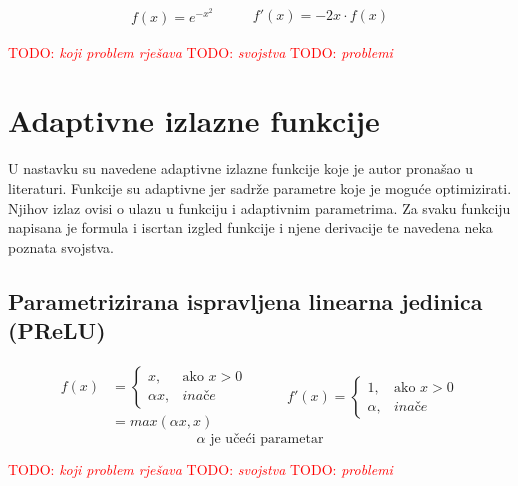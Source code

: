 \documentclass[times, utf8, numeric, diplomski]{fer}
\def\otherwise{\textit{inače}}
\def\TODO#1{\noindent\textcolor{red}{TODO: \textit{#1}}\newline}
\def\todo#1{\TODO{#1}}
\def\todoimg#1{\begin{center} \textcolor{red}{\big[ IMAGE: \textit{#1} \big]} \end{center}}
\begin{document}
\begin{equation}
\label{eq:gauss}
\begin{split}
f(x) = e^{-x^2}
\end{split}
\qquad
\begin{split}
f'(x) = -2x \cdot f(x)
\end{split}
\end{equation}

\todo{koji problem rješava}
\todo{svojstva}
\todo{problemi}

\iffalse %
\section{Adaptivne izlazne funkcije}
U nastavku su navedene adaptivne izlazne funkcije koje je autor pronašao u literaturi. Funkcije su adaptivne jer sadrže parametre koje je moguće optimizirati. Njihov izlaz ovisi o ulazu u funkciju i adaptivnim parametrima. Za svaku funkciju napisana je formula i iscrtan izgled funkcije i njene derivacije te navedena neka poznata svojstva.

\subsection{Parametrizirana ispravljena linearna jedinica (PReLU)}

\todoimg{}

\begin{equation}
\begin{split}
f(x) &= \begin{cases}
x,			& \text{ako } x > 0 \\
\alpha x,	& \otherwise
\end{cases} \\
&= max(\alpha x, x)
\end{split}
\qquad
\begin{split}
f'(x) = 
\begin{cases}
1,		& \text{ako } x > 0 \\
\alpha,	& \otherwise
\end{cases}
\end{split}
\end{equation}
\begin{equation*}
\alpha \text{ je učeći parametar}
\end{equation*}

\todo{koji problem rješava}
\todo{svojstva}
\todo{problemi}
\end{document}
